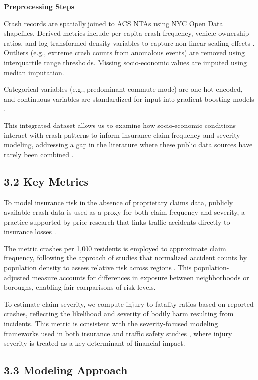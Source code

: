 \documentclass[
  number,
  review,
  3p]{elsarticle}
\begin{document}
\textbf{Preprocessing Steps}

Crash records are spatially joined to ACS NTAs using NYC Open Data
shapefiles. Derived metrics include per-capita crash frequency, vehicle
ownership ratios, and log-transformed density variables to capture
non-linear scaling effects \citep{cabrera}. Outliers (e.g., extreme
crash counts from anomalous events) are removed using interquartile
range thresholds. Missing socio-economic values are imputed using median
imputation.

Categorical variables (e.g., predominant commute mode) are one-hot
encoded, and continuous variables are standardized for input into
gradient boosting models \citep{henckaerts}.

This integrated dataset allows us to examine how socio-economic
conditions interact with crash patterns to inform insurance claim
frequency and severity modeling, addressing a gap in the literature
where these public data sources have rarely been combined
\citep[\citep{jonkheijm}]{mohamed}.

\subsection{3.2 Key Metrics}\label{key-metrics}

To model insurance risk in the absence of proprietary claims data,
publicly available crash data is used as a proxy for both claim
frequency and severity, a practice supported by prior research that
links traffic accidents directly to insurance losses
\citep[\citep{dong}]{adeniyi}.

The metric crashes per 1,000 residents is employed to approximate claim
frequency, following the approach of studies that normalized accident
counts by population density to assess relative risk across regions
\citep[\citep{cabrera}]{brubacher}. This population-adjusted measure
accounts for differences in exposure between neighborhoods or boroughs,
enabling fair comparisons of risk levels.

To estimate claim severity, we compute injury-to-fatality ratios based
on reported crashes, reflecting the likelihood and severity of bodily
harm resulting from incidents. This metric is consistent with the
severity-focused modeling frameworks used in both insurance
\citep[\citep{henckaerts}]{clemente} and traffic safety studies
\citep{dong}, where injury severity is treated as a key determinant of
financial impact.

\subsection{3.3 Modeling Approach}\label{modeling-approach}
\end{document}
